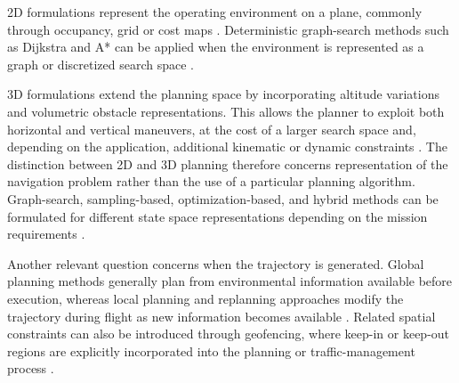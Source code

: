 \documentclass[electronics,article,submit,moreauthors]{Definitions/mdpi}
\DeclareRobustCommand{\deleted}[1]{}%
\DeclareRobustCommand{\added}[1]{#1}%
\DeclareRobustCommand{\deleted}[1]{\textcolor{black}{\sout{#1}}}
\DeclareRobustCommand{\added}[1]{\textcolor{green!50!black}{#1}}
\def\deleted#1{}%
\def\added#1{#1}%
\begin{document}
\deleted{For power-line inspection, the local planning problem is more operational than academic. The vehicle must continue progressing through a mission corridor, while structures, animals, vehicles, or uninvolved people may appear in the neighborhood of the route. Power-line inspection has therefore developed its own system literature, from UAV-image approaches for corridor measurement and obstacle localization \cite{zhang2017powerline} to line detection in cluttered scenes \cite{zhang2019powerlines}, LiDAR-supported automatic inspection \cite{guan2021uavlidar}, dual-view stereovision for reconstruction and clearance estimation \cite{zhou2022dualview}, and dedicated reviews of UAV-enabled power-line inspection \cite{mendu2025state}. On the perception side, Bellou \emph{et al.} report aerial inspection based on YOLOv8 for towers, conductors and insulators \cite{bellou2024aerial}, while Faisal \emph{et al.} synthesize more than 70 studies and identify persistent gaps in multimodal fusion and deployment realism \cite{faisal2025deep}. On the planning side, Huang \emph{et al.} propose a hybrid RRT*+DWA method for dynamic obstacle avoidance in UAV-based power inspection \cite{huang2025hybrid}. These works are highly relevant, but their central objective is still efficient and safe inspection autonomy, not explicit no-overflight treatment of uninvolved people under European operational logic.}

\added{2D formulations represent the operating environment on a plane, commonly through occupancy, grid or cost maps \cite{merei2025survey}. Deterministic graph-search methods such as Dijkstra and A* can be applied when the environment is represented as a graph or discretized search space \cite{lavalle2006planning}.}

\added{3D formulations extend the planning space by incorporating altitude variations and volumetric obstacle representations. This allows the planner to exploit both horizontal and vertical maneuvers, at the cost of a larger search space and, depending on the application, additional kinematic or dynamic constraints \cite{merei2025survey, nafees2026review}. The distinction between 2D and 3D planning therefore concerns representation of the navigation problem rather than the use of a particular planning algorithm. Graph-search, sampling-based, optimization-based, and hybrid methods can be formulated for different state space representations depending on the mission requirements \cite{lavalle2006planning, meng2025advances}.}

\added{Another relevant question concerns when the trajectory is generated. Global planning methods generally plan from environmental information available before execution, whereas local planning and replanning approaches modify the trajectory during flight as new information becomes available \cite{debnath2024review, meng2025advances}. Related spatial constraints can also be introduced through geofencing, where keep-in or keep-out regions are explicitly incorporated into the planning or traffic-management process \cite{stevens2021geofence}.}
\end{document}
